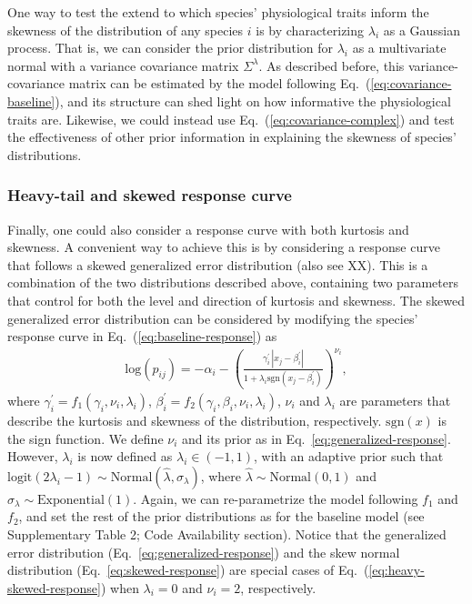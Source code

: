 \documentclass[11pt, a4paper]{article}
\begin{document}
One way to test the extend to which species' physiological traits inform the skewness of the distribution of any species $i$ is by characterizing $\lambda_{i}$ as a Gaussian process. That is, we can consider the prior distribution for $\lambda_{i}$ as a multivariate normal with a variance covariance matrix $\Sigma^{\lambda}$. As described before, this variance-covariance matrix can be estimated by the model following Eq.~(\ref{eq:covariance-baseline}), and its structure can shed light on how informative the physiological traits are. Likewise, we could instead use Eq.~(\ref{eq:covariance-complex}) and test the effectiveness of other prior information in explaining the skewness of species' distributions.

\subsubsection*{Heavy-tail and skewed response curve}
Finally, one could also consider a response curve with both kurtosis and skewness. A convenient way to achieve this is by considering a response curve that follows a skewed generalized error distribution (also see XX). This is a combination of the two distributions described above, containing two parameters that control for both the level and direction of kurtosis and skewness. The skewed generalized error distribution can be considered by modifying the species' response curve in Eq.~(\ref{eq:baseline-response}) as
\begin{equation}	
\begin{split}
\text{log}\left(p_{ij}\right) = -\alpha_{i} - \left(\frac{\gamma^{\prime}_{i}\,|x_{j}-\beta^{\prime}_{i}|}{1+\lambda_{i} \text{sgn}\left(x_{j}-\beta^{\prime}_{i}\right)}\right)^{\nu_{i}} ,
\end{split}
\label{eq:heavy-skewed-response}
\end{equation}
where $\gamma^{\prime}_{i} = f_{1}\left(\gamma_{i}, \nu_{i}, \lambda_{i}\right)$, $\beta^{\prime}_{i} = f_{2}\left(\gamma_{i}, \beta_{i}, \nu_{i}, \lambda_{i}\right)$, $\nu_{i}$ and $\lambda_i$ are parameters that describe the kurtosis and skewness of the distribution, respectively. $\text{sgn}\left(x\right)$ is the sign function. We define $\nu_i$ and its prior as in Eq.~\ref{eq:generalized-response}. However, $\lambda_i$ is now defined as $\lambda_{i}\in\left(-1, 1\right)$, with an adaptive prior such that $\text{logit}\left(2\lambda_{i}-1\right)\sim \text{Normal}\left(\hat{\lambda}, \sigma_{\lambda}\right)$, where $\hat{\lambda}\sim\text{Normal}\left(0, 1\right)$ and $\sigma_{\lambda}\sim\text{Exponential}\left(1\right)$. Again, we can re-parametrize the model following $f_1$ and $f_2$, and set the rest of the prior distributions as for the baseline model (see Supplementary Table 2; Code Availability section). Notice that the generalized error distribution (Eq.~\ref{eq:generalized-response}) and the skew normal distribution (Eq.~\ref{eq:skewed-response}) are special cases of Eq.~(\ref{eq:heavy-skewed-response}) when $\lambda_i=0$ and $\nu_i=2$, respectively.
\end{document}
